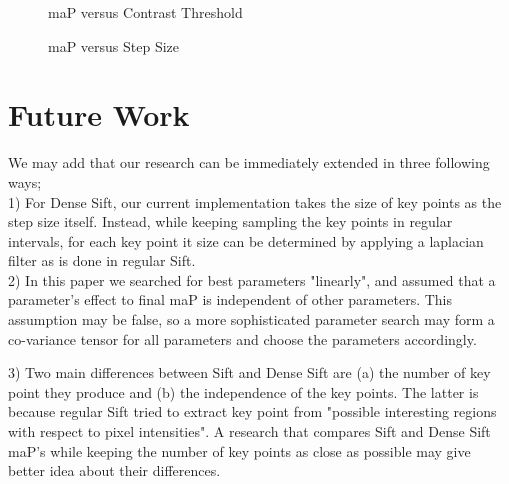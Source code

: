 \documentclass[conference,compsoc]{IEEEtran}
\begin{document}
\begin{figure}
\caption{maP versus Contrast Threshold}
\end{figure}

\begin{figure}
\caption{maP versus Step Size}
\end{figure}

\section{Future Work}
We may add that our research can be immediately extended in three following ways; \\

1) For Dense Sift, our current implementation takes the size of key points as the step size itself. Instead, while keeping sampling the key points in regular intervals, for each key point it size can be determined by applying a laplacian filter as is done in regular Sift. \\

2) In this paper we searched for best parameters "linearly", and assumed that a parameter's effect to final maP is independent of other parameters. This assumption may be false, so a more sophisticated parameter search may form a co-variance tensor for all parameters and choose the parameters accordingly.

3) Two main differences between Sift and Dense Sift are (a) the number of key point they produce and (b) the independence of the key points. The latter is because regular Sift tried to extract key point from "possible interesting regions with respect to pixel intensities". A research that compares Sift and Dense Sift maP's while keeping the number of key points as close as possible may give better idea about their differences.
\end{document}

